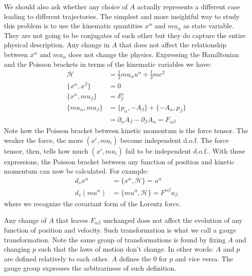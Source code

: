 \documentclass[aps,pra,10pt,twocolumn,floatfix,nofootinbib]{revtex4-1}
\numberwithin{equation}{section}
\theoremstyle{definition}
\begin{document}
We should also ask whether any choice of $A$ actually represents a different case leading to different trajectories. The simplest and more insightful way to study this problem is to use the kinematic quantities $x^\alpha$ and $mu_\alpha$ as state variable. They are not going to be conjugates of each other but they do capture the entire physical description. Any change in $A$ that does not affect the relationship between $x^\alpha$ and $mu_\alpha$ does not change the physics. Expressing the Hamiltonian and the Poisson brackets in terms of the kinematic variables we have:
\begin{align*}
\mathcal{H}&=\frac{1}{2}mu_\alpha u^\alpha + \frac{1}{2} m c^2 \\
\{x^\alpha, x^\beta\} &= 0 \\
\{x^\alpha, mu_\beta\} &= \delta^\alpha_\beta \\
\{mu_\alpha, mu_\beta\} &= \{p_\alpha, - A_\beta\} + \{-A_\alpha, p_\beta\} \\
&= \partial_\alpha A_\beta - \partial_\beta A_\alpha = F_{\alpha\beta}
\end{align*}
Note how the Poisson bracket between kinetic momentum is the force tensor. The weaker the force, the more $(x^i, mu_i)$ become independent d.o.f. The force tensor, then, tells how much $(x^i, mu_i)$ fail to be independent d.o.f.. With these expressions, the Poisson bracket between any function of position and kinetic momentum can now be calculated. For example:
\begin{align*}
d_s x^\alpha &= \{x^\alpha, \mathcal{H}\} = u^\alpha \\
d_s (mu^\alpha) &= \{mu^\alpha, \mathcal{H}\} = F^{\alpha\beta} u_\beta
\end{align*}
where we recognize the covariant form of the Lorentz force.

Any change of $A$ that leaves $F_{\alpha\beta}$ unchanged does not affect the evolution of any function of position and velocity. Such transformation is what we call a gauge transformation. Note the same group of transformations is found by fixing $A$ and changing $p$ such that the laws of motion don't change. In other words: $A$ and $p$ are defined relatively to each other. $A$ defines the $0$ for $p$ and vice versa. The gauge group expresses the arbitrariness of such definition.
\end{document}
